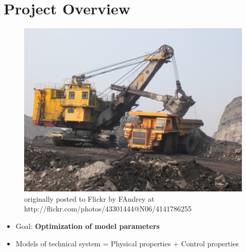\section{Project Overview}

\begin{frame}
	\begin{figure}[t]
		\centering
		\includegraphics[width=.6\linewidth]{img/Excavator} \\
		\tiny{originally posted to Flickr by FAndrey at http://flickr.com/photos/43301444@N06/4141786255}
	\end{figure}

	\begin{itemize}
		\item{Goal: \textbf{Optimization of model parameters}}
		\item{Models of technical system = Physical properties + Control properties}
	\end{itemize}
\end{frame}




